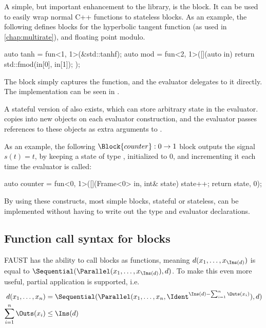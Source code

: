 A simple, but important enhancement to the library, is the  block. It can be used to
easily wrap normal C++ functions to stateless blocks. As an example, the following defines blocks for the
hyperbolic tangent function (as used in \autoref{chap:multirate}), and floating point modulo.

\begin{cppcodenl}
  auto tanh = fun<1, 1>(&std::tanhf);
  auto mod = fun<2, 1>([](auto in) { return std::fmod(in[0], in[1]); });
\end{cppcodenl}

The  block simply captures the function, and the evaluator delegates to it directly.
The implementation can be seen in .

A stateful version of  also exists, which can store arbitrary state in the evaluator.  copies 
into new objects on each evaluator construction, and the evaluator passes references to these objects as
extra arguments to .

As an example, the following $\Block{counter} : 0 \rightarrow 1$ block outputs the signal $s(t) = t$, by
keeping a state of type , initialized to $0$, and incrementing it
each time the evaluator is called:

\begin{cppcodenl}
  auto counter = fun<0, 1>([](Frame<0> in, int& state) { state++; return {state}}, 0);
\end{cppcodenl}

By using these constructs, most simple blocks, stateful or stateless, can be implemented without having to
write out the type and evaluator declarations.

\subsection{Function call syntax for blocks}
\label{sec:eda_partial_application}

FAUST has the ability to call blocks as functions, meaning $d(x_1, \dots, x_{\Ins(d)})$ is equal to
$\Sequential(\Parallel(x_1, \dots, x_{\Ins(d)}), d)$. To make this even more useful, partial application is supported, i.e.
% 
\begin{align*}
  d(x_1, \dots, x_n)      & ={} \Sequential(\Parallel(x_1, \dots, x_n, \Ident^{\Ins(d) - \sum^n_{i=1} \Outs(x_i)}), d) \\
  \sum^n_{i=1} \Outs(x_i) & \leq \Ins(d)
\end{align*}

